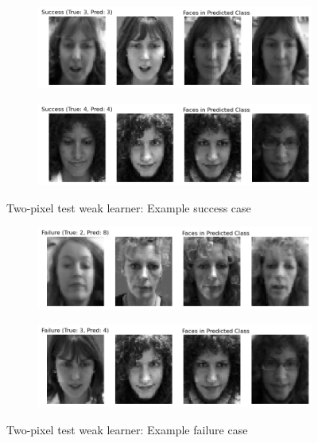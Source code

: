 \begin{figure}[htbp]
	\centering
	\begin{subfigure}{0.45\linewidth}
		\centering
		\includegraphics[width=\linewidth]{image/q5-app/q5-two-succ1.png}
	\end{subfigure}%
	\quad
	\begin{subfigure}{0.45\linewidth}
		\centering
		\includegraphics[width=\linewidth]{image/q5-app/q5-two-succ2.png}
	\end{subfigure}
	\caption{Two-pixel test weak learner: Example success case}
	\label{fig:app-q5-4}
\end{figure}
\begin{figure}[htbp]
	\centering
	\begin{subfigure}{0.45\linewidth}
		\centering
		\includegraphics[width=\linewidth]{image/q5-app/q5-two-fail1.png}
	\end{subfigure}%
	\quad
	\begin{subfigure}{0.45\linewidth}
		\centering
		\includegraphics[width=\linewidth]{image/q5-app/q5-two-fail2.png}
	\end{subfigure}
	\caption{Two-pixel test weak learner: Example failure case}
	\label{fig:app-q5-5}
\end{figure}

